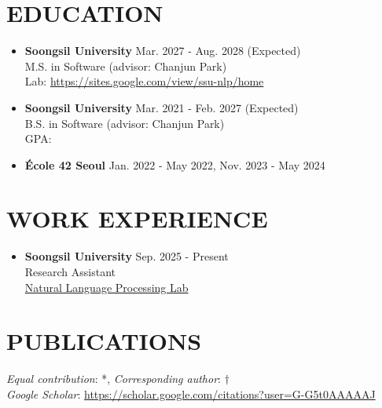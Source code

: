 \documentclass[10pt,a4paper]{article}
\newcommand{\seclabel}[1]{\section*{\uppercase{#1}}}
\newcommand{\cvitem}[2]{\textbf{#1} \hfill \small{#2}\\}
\begin{document}
\seclabel{Education}
\begin{itemize}
    \item \cvitem{Soongsil University}{Mar. 2027 - Aug. 2028 (Expected)}
    \small{M.S. in Software (advisor: Chanjun Park) \\
    Lab: \href{https://sites.google.com/view/ssu-nlp/home}{https://sites.google.com/view/ssu-nlp/home}}

    \item \cvitem{Soongsil University}{Mar. 2021 - Feb. 2027 (Expected)}
    \small{B.S. in Software (advisor: Chanjun Park) \\
    GPA: \mbox{}}

    \item \cvitem{École 42 Seoul}{Jan. 2022 - May 2022, Nov. 2023 - May 2024}
    \small{\mbox{}}
\end{itemize}

\seclabel{Work Experience}
\begin{itemize}
    \item \cvitem{Soongsil University}{Sep. 2025 - Present}
    \small{Research Assistant \\
    \href{https://sites.google.com/view/ssu-nlp/home}{Natural Language Processing Lab}}
\end{itemize}

\newpage

\seclabel{Publications}
\textit{Equal contribution}: *, \textit{Corresponding author}: $\dagger$
\vspace{0.4em} \\
\noindent\textit{Google Scholar}: \href{https://scholar.google.com/citations?user=G-G5t0AAAAAJ&hl=ko}{https://scholar.google.com/citations?user=G-G5t0AAAAAJ}
\end{document}
